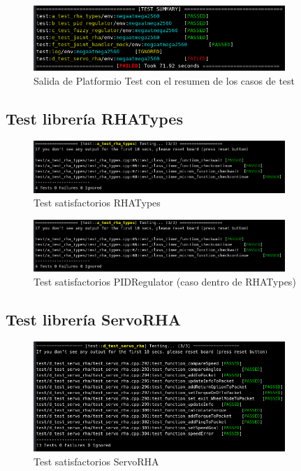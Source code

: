     \begin{figure}[H]
    	\centering
    	\includegraphics[width=0.85\textwidth]{figuras/Imagenes_SW/test/Seleccion_036.png}   
    	\caption{Salida de Platformio Test con el resumen de los casos de test}
    	\label{fig:SW:test:sum_output}
    \end{figure}
	
	\subsection{Test librería RHATypes}
	
		\begin{figure}[H]
			\centering
			\includegraphics[width=0.85\textwidth]{figuras/Imagenes_SW/test/Seleccion_033.png}   
			\caption{Test satisfactorios RHATypes}
			\label{fig:SW:test:rha_types_ok}
		\end{figure}
		\begin{figure}[H]
			\centering
			\includegraphics[width=0.85\textwidth]{figuras/Imagenes_SW/test/Seleccion_033.png}   
			\caption{Test satisfactorios PIDRegulator (caso dentro de RHATypes)}
			\label{fig:SW:test:pid_regulator_ok}
		\end{figure}
	\subsection{Test librería ServoRHA}
		\begin{figure}[H]
			\centering
			\includegraphics[width=0.85\textwidth]{figuras/Imagenes_SW/test/Seleccion_037.png}   
			\caption{Test satisfactorios ServoRHA}
			\label{fig:SW:test:servo_rha_ok}
		\end{figure}
